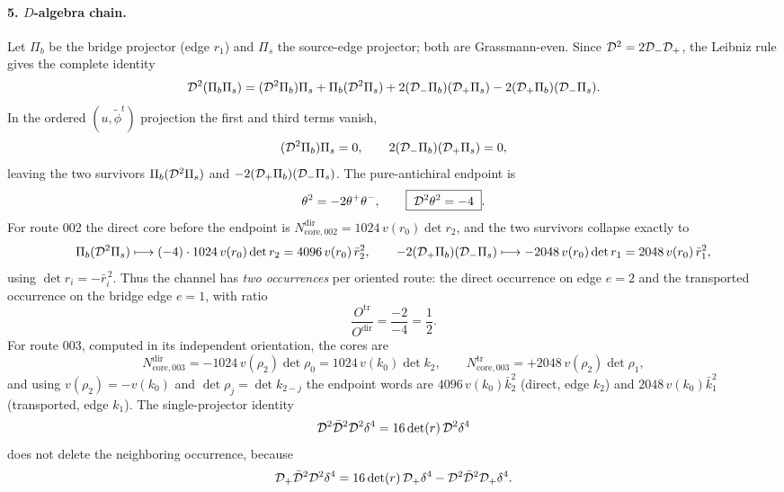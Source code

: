 \paragraph{5. $D$-algebra chain.} Let $\Pi_b$ be the bridge projector (edge
$r_1$) and $\Pi_s$ the source-edge projector; both are Grassmann-even. Since
$\mathcal{D}^{2}=2\mathcal{D}_-\mathcal{D}_+$, the Leibniz rule gives the complete identity
\begin{equation}\label{eq:ss:bb-productrule}
\mathcal{D}^{2}(\Pi_b\Pi_s)
=(\mathcal{D}^{2}\Pi_b)\Pi_s+\Pi_b(\mathcal{D}^{2}\Pi_s)
+2(\mathcal{D}_-\Pi_b)(\mathcal{D}_+\Pi_s)-2(\mathcal{D}_+\Pi_b)(\mathcal{D}_-\Pi_s).
\end{equation}
In the ordered $(u,\widetilde\phi^{t})$ projection the first and third terms
vanish,
\begin{equation}\label{eq:ss:bb-survivors}
(\mathcal{D}^{2}\Pi_b)\Pi_s=0,\qquad 2(\mathcal{D}_-\Pi_b)(\mathcal{D}_+\Pi_s)=0,
\end{equation}
leaving the two survivors $\Pi_b(\mathcal{D}^{2}\Pi_s)$ and
$-2(\mathcal{D}_+\Pi_b)(\mathcal{D}_-\Pi_s)$. The pure-antichiral endpoint is
\begin{equation}\label{eq:ss:bb-endpoint}
\theta^{2}=-2\theta^{+}\theta^{-},
\qquad
\boxed{\;\mathcal{D}^{2}\theta^{2}=-4\;}.
\end{equation}
For route 002 the direct core before the endpoint is
$N_{\mathrm{core},002}^{\mathrm{dir}}=1024\,v(r_0)\det r_2$, and the two
survivors collapse exactly to
\begin{equation}\label{eq:ss:bb-route002}
\Pi_b(\mathcal{D}^{2}\Pi_s)\longmapsto(-4)\cdot1024\,v(r_0)\det r_2
=4096\,v(r_0)\,\bar r_2^{2},
\qquad
-2(\mathcal{D}_+\Pi_b)(\mathcal{D}_-\Pi_s)\longmapsto-2048\,v(r_0)\det r_1
=2048\,v(r_0)\,\bar r_1^{2},
\end{equation}
using $\det r_i=-\bar r_i^{\,2}$. Thus the channel has \emph{two occurrences}
per oriented route: the direct occurrence on edge $e=2$ and the transported
occurrence on the bridge edge $e=1$, with ratio
\begin{equation}\label{eq:ss:bb-ratio}
\frac{O^{\mathrm{tr}}}{O^{\mathrm{dir}}}=\frac{-2}{-4}=\frac12 .
\end{equation}
For route 003, computed in its independent orientation, the cores are
\begin{equation}\label{eq:ss:bb-route003}
N_{\mathrm{core},003}^{\mathrm{dir}}=-1024\,v(\rho_2)\det\rho_0
=1024\,v(k_0)\det k_2,
\qquad
N_{\mathrm{core},003}^{\mathrm{tr}}=+2048\,v(\rho_2)\det\rho_1,
\end{equation}
and using $v(\rho_2)=-v(k_0)$ and $\det\rho_j=\det k_{2-j}$ the endpoint words
are $4096\,v(k_0)\bar k_2^{2}$ (direct, edge $k_2$) and $2048\,v(k_0)\bar
k_1^{2}$ (transported, edge $k_1$). The single-projector identity
\begin{equation}\label{eq:ss:bb-projectorid}
\mathcal{D}^{2}\bar{\mathcal{D}}^{2}\mathcal{D}^{2}\delta^{4}=16\det(r)\,\mathcal{D}^{2}\delta^{4}
\end{equation}
does not delete the neighboring occurrence, because
\begin{equation}\label{eq:ss:bb-projectorid2}
\mathcal{D}_+\bar{\mathcal{D}}^{2}\mathcal{D}^{2}\delta^{4}
=16\det(r)\,\mathcal{D}_+\delta^{4}-\mathcal{D}^{2}\bar{\mathcal{D}}^{2}\mathcal{D}_+\delta^{4}.
\end{equation}


